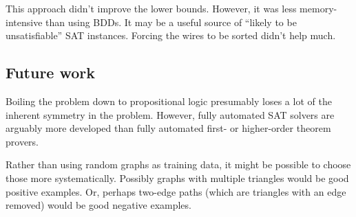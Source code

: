 \documentclass[12pt]{article}
\begin{document}
This approach didn't improve the lower bounds. However, it was
less memory-intensive than using BDDs. It may be a useful source
of ``likely to be unsatisfiable'' SAT instances.
Forcing the wires to be sorted didn't help much.

\subsection{Future work}

Boiling the problem down to propositional logic presumably loses a lot of the inherent
symmetry in the problem. However, fully automated SAT solvers are arguably more developed
than fully automated first- or higher-order theorem provers.

Rather than using random graphs as training data, it might be possible to choose those
more systematically. Possibly graphs with multiple triangles would be good positive examples.
Or, perhaps two-edge paths (which are triangles with an edge removed) would be good negative
examples.



\end{document}
